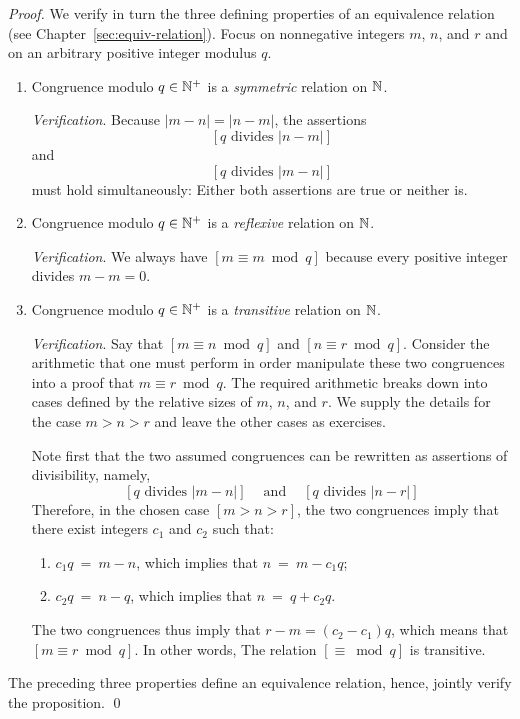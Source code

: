 \begin{proof}
We verify in turn the three defining properties of an equivalence relation (see Chapter~\ref{sec:equiv-relation}).  Focus on nonnegative integers $m$, $n$, and $r$ and on an arbitrary positive integer modulus $q$.
\begin{enumerate}
\item
Congruence modulo $q \in \mathbb{N}^+$ is a {\em symmetric} relation on $\mathbb{N}$.

\smallskip

{\it Verification}.
Because $|m-n| = |n-m|$, the assertions
\[ [q \mbox{ divides } |n-m|] \]
and
\[ [q \mbox{ divides } |m-n|] \]
must hold simultaneously: Either both assertions are true or neither is.

\item
Congruence modulo $q \in \mathbb{N}^+$ is a {\em reflexive} relation on $\mathbb{N}$.

\smallskip

{\it Verification}.
We always have $[m \equiv m \bmod q]$ because every positive integer divides $m-m = 0$.

\item
Congruence modulo $q \in \mathbb{N}^+$ is a {\em transitive} relation on $\mathbb{N}$.

\smallskip

{\it Verification}.
Say that $[m \equiv n \bmod q]$ and $[n \equiv r \bmod q]$.  Consider the arithmetic that one must perform in order manipulate these two congruences into a proof that $m \equiv r \bmod q$.   The required arithmetic breaks down into cases defined by the relative sizes of $m$, $n$, and $r$.  We supply the details for the case $m > n > r$ and leave the other cases as exercises.

\smallskip

Note first that the two assumed congruences can be rewritten as assertions of divisibility, namely, \[ [q \mbox{ divides } |m-n|] \ \ \ \ \mbox{ and } \ \ \ \ [q \mbox{ divides } |n-r|] \]
Therefore, in the chosen case $[m > n > r]$, the two congruences imply that there exist integers $c_1$ and $c_2$ such that:
  \begin{enumerate}
  \item
$c_1 q \ = \ m-n$, which implies that $n \ = \ m - c_1 q$;
  \item
$c_2 q \ = \ n-q$, which implies that $n \ = \ q + c_2 q$.
  \end{enumerate}
The two congruences thus imply that $r-m = (c_2-c_1) q$, which means that $[m \equiv r
\bmod q]$.  In other words, The relation $[\equiv \bmod q]$ is transitive.
\end{enumerate}
The preceding three properties define an equivalence relation, hence, jointly verify the proposition. \qed
\end{proof}

